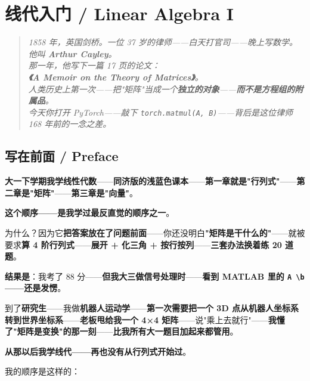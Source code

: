 
\chapter{线代入门 / Linear Algebra I}
\label{ch:linalg1}

\begin{quote}\itshape
1858 年，英国剑桥。一位 37 岁的律师——白天打官司——晚上写数学。\\
他叫 \textbf{Arthur Cayley}。\\
那一年，他写下一篇 17 页的论文：\\
\textbf{《A Memoir on the Theory of Matrices》}。\\
人类历史上第一次——把"矩阵"当成一个\textbf{独立的对象}——\textbf{而不是方程组的附属品}。\\[6pt]
今天你打开 PyTorch——敲下 \texttt{torch.matmul(A, B)}——背后是这位律师 168 年前的一念之差。
\end{quote}

\section{写在前面 / Preface}

\textbf{大一下学期我学线性代数}——\textbf{同济版的浅蓝色课本}——\textbf{第一章就是"行列式"}——\textbf{第二章是"矩阵"}——\textbf{第三章是"向量"}。

\textbf{这个顺序——是我学过最反直觉的顺序之一}。

为什么？因为它\textbf{把答案放在了问题前面}——你还没明白\textbf{"矩阵是干什么的"}——就被要求\textbf{算 4 阶行列式}——\textbf{展开 + 化三角 + 按行按列}——\textbf{三套办法换着练 20 道题}。

\textbf{结果是}：我考了 88 分——\textbf{但我大三做信号处理时}——\textbf{看到 MATLAB 里的 \texttt{A \textbackslash b}——还是发愣}。

到了\textbf{研究生}——我做\textbf{机器人运动学}——\textbf{第一次需要把一个 3D 点从机器人坐标系转到世界坐标系}——\textbf{老板甩给我一个 4×4 矩阵}——说"乘上去就行"——\textbf{我懂了"矩阵是变换"的那一刻}——\textbf{比我所有大一题目加起来都管用}。

\textbf{从那以后我学线代——再也没有从行列式开始过}。

我的顺序是这样的：

